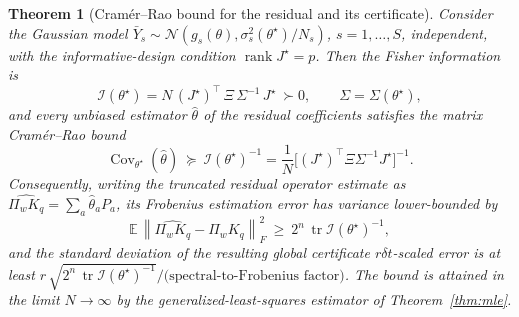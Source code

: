 \documentclass[aps,prxquantum,reprint,superscriptaddress,nofootinbib,amsmath,amssymb]{revtex4-2}
\newcommand{\norm}[1]{\left\lVert #1 \right\rVert}
\newcommand{\dt}{\delta t}
\newtheorem{theorem}{Theorem}
\begin{document}
\begin{theorem}[Cram\'er--Rao bound for the residual and its certificate]
\label{thm:crb}
Consider the Gaussian model $\bar Y_s\sim\mathcal{N}(g_s(\theta),\sigma_s^2(\theta^\star)/N_s)$, $s=1,\dots,S$, independent, with the informative-design condition $\operatorname{rank}J^\star=p$. Then the Fisher information is
\begin{equation}
    \mathcal{I}(\theta^\star)=N\,(J^\star)^\top\,\Xi\,\Sigma^{-1}\,J^\star\ \succ0,
    \qquad \Sigma=\Sigma(\theta^\star),
    \label{eq:crb-fisher}
\end{equation}
and every unbiased estimator $\hat\theta$ of the residual coefficients satisfies the matrix Cram\'er--Rao bound
\begin{equation}
    \operatorname{Cov}_{\theta^\star}(\hat\theta)\ \succeq\ \mathcal{I}(\theta^\star)^{-1}
    =\frac1N\bigl[(J^\star)^\top\Xi\Sigma^{-1}J^\star\bigr]^{-1}.
    \label{eq:crb-matrix}
\end{equation}
Consequently, writing the truncated residual operator estimate as $\widehat{\Pi_wK_q}=\sum_a\hat\theta_aP_a$, its Frobenius estimation error has variance lower-bounded by
\begin{equation}
    \mathbb{E}\,\norm{\widehat{\Pi_wK_q}-\Pi_wK_q}_F^2\ \geq\ 2^n\,\operatorname{tr}\mathcal{I}(\theta^\star)^{-1},
    \label{eq:crb-frob}
\end{equation}
and the standard deviation of the resulting global certificate $r\dt$-scaled error is at least $r\,\sqrt{2^n\,\operatorname{tr}\mathcal{I}(\theta^\star)^{-1}}\big/\text{(spectral-to-Frobenius factor)}$. The bound is attained in the limit $N\to\infty$ by the generalized-least-squares estimator of Theorem~\ref{thm:mle}.
\end{theorem}
\end{document}
